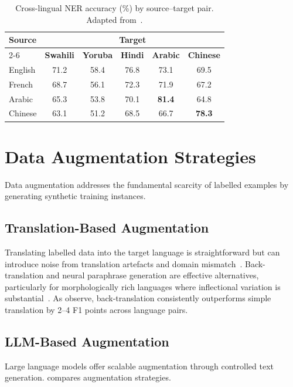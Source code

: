 \documentclass[
    language=english,
    doctype=article,
    institution=none,
    titlestyle=book,
]{../../omnilatex}
\begin{document}
\begin{table}[htbp]
\centering
\caption{Cross-lingual NER accuracy (\%) by source--target pair.  Adapted
from~\parencite{hu2020xtreme}.}
\label{tab:cross-lingual}
\begin{tabular}{lccccc}
\toprule
\multirow{2}{*}{\textbf{Source}} & \multicolumn{5}{c}{\textbf{Target}}
    \\
\cmidrule(l){2-6}
    & \textbf{Swahili} & \textbf{Yoruba} & \textbf{Hindi} & \textbf{Arabic}
    & \textbf{Chinese} \\
\midrule
English & 71.2 & 58.4 & 76.8 & 73.1 & 69.5 \\
French  & 68.7 & 56.1 & 72.3 & 71.9 & 67.2 \\
Arabic  & 65.3 & 53.8 & 70.1 & \textbf{81.4} & 64.8 \\
Chinese & 63.1 & 51.2 & 68.5 & 66.7 & \textbf{78.3} \\
\bottomrule
\end{tabular}
\end{table}

\section{Data Augmentation Strategies}
\label{sec:augmentation}
Data augmentation addresses the fundamental scarcity of labelled examples by
generating synthetic training instances.

\subsection{Translation-Based Augmentation}
Translating labelled data into the target language is straightforward but can
introduce noise from translation artefacts and domain
mismatch~\cite{zhang2020backtranslation}.  Back-translation and neural
paraphrase generation are effective alternatives, particularly for
morphologically rich languages where inflectional variation is
substantial~\cite{siddhant2020meta,tran2021improving}.  As
\textcite{kobak2021cross} observe, back-translation consistently outperforms
simple translation by 2--4 F1 points across language pairs.

\subsection{LLM-Based Augmentation}
Large language models offer scalable augmentation through controlled text
generation.   compares augmentation strategies.
\end{document}
